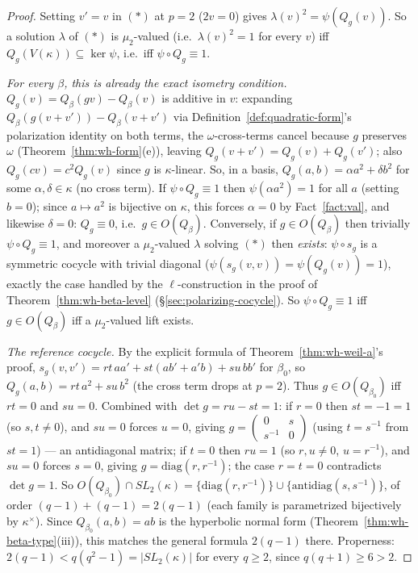\begin{proof}
Setting $v'=v$ in $(*)$ at $p=2$ ($2v=0$) gives $\lambda(v)^2=\psi(Q_g(v))$.
So a solution $\lambda$ of $(*)$ is $\mu_2$-valued (i.e.\ $\lambda(v)^2=1$
for every $v$) iff $Q_g(V(\kappa))\subseteq\ker\psi$, i.e.\ iff
$\psi\circ Q_g\equiv 1$.

\emph{For every $\beta$, this is already the exact isometry condition.}
$Q_g(v)=Q_\beta(gv)-Q_\beta(v)$ is additive in $v$: expanding
$Q_\beta(g(v+v'))-Q_\beta(v+v')$ via Definition~\ref{def:quadratic-form}'s
polarization identity on both terms, the $\omega$-cross-terms cancel because
$g$ preserves $\omega$ (Theorem~\ref{thm:wh-form}(e)), leaving
$Q_g(v+v')=Q_g(v)+Q_g(v')$; also $Q_g(cv)=c^2Q_g(v)$ since $g$ is
$\kappa$-linear. So, in a basis, $Q_g(a,b)=\alpha a^2+\delta b^2$ for some
$\alpha,\delta\in\kappa$ (no cross term). If $\psi\circ Q_g\equiv 1$ then
$\psi(\alpha a^2)=1$ for all $a$ (setting $b=0$); since $a\mapsto a^2$ is
bijective on $\kappa$, this forces $\alpha=0$ by Fact~\ref{fact:val}, and
likewise $\delta=0$: $Q_g\equiv 0$, i.e.\ $g\in O(Q_\beta)$. Conversely, if
$g\in O(Q_\beta)$ then trivially $\psi\circ Q_g\equiv 1$, and moreover a
$\mu_2$-valued $\lambda$ solving $(*)$ then \emph{exists}: $\psi\circ s_g$ is
a symmetric cocycle with trivial diagonal ($\psi(s_g(v,v))=\psi(Q_g(v))=1$),
exactly the case handled by the $\ell$-construction in the proof of
Theorem~\ref{thm:wh-beta-level} (\S\ref{sec:polarizing-cocycle}). So
$\psi\circ Q_g\equiv 1$ iff $g\in O(Q_\beta)$ iff a $\mu_2$-valued lift
exists.

\emph{The reference cocycle.} By the explicit formula of
Theorem~\ref{thm:wh-weil-a}'s proof, $s_g(v,v')=rt\,aa'+st(ab'+a'b)+su\,bb'$
for $\beta_0$, so $Q_g(a,b)=rt\,a^2+su\,b^2$ (the cross term drops at
$p=2$). Thus $g\in O(Q_{\beta_0})$ iff $rt=0$ and $su=0$. Combined with
$\det g=ru-st=1$: if $r=0$ then $st=-1=1$ (so $s,t\neq0$), and $su=0$ forces
$u=0$, giving $g=\left(\begin{smallmatrix}0&s\\s^{-1}&0\end{smallmatrix}\right)$
(using $t=s^{-1}$ from $st=1$) — an antidiagonal matrix; if $t=0$ then
$ru=1$ (so $r,u\neq0$, $u=r^{-1}$), and $su=0$ forces $s=0$, giving
$g=\mathrm{diag}(r,r^{-1})$; the case $r=t=0$ contradicts $\det g=1$. So
$O(Q_{\beta_0})\cap SL_2(\kappa)=\{\mathrm{diag}(r,r^{-1})\}\cup\{\mathrm{antidiag}(s,s^{-1})\}$,
of order $(q-1)+(q-1)=2(q-1)$ (each family is parametrized bijectively by
$\kappa^\times$). Since $Q_{\beta_0}(a,b)=ab$ is the hyperbolic normal form
(Theorem~\ref{thm:wh-beta-type}(iii)), this matches the general formula
$2(q-1)$ there. Properness: $2(q-1) < q(q^2-1) = |SL_2(\kappa)|$ for every
$q\geq 2$, since $q(q+1)\geq 6 > 2$.
\end{proof}

